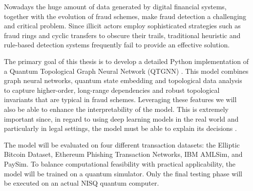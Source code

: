 \begin{center}
\Large{}
\end{center}
\bigskip

\begin{itshape}
Nowadays the huge amount of data generated by digital financial systems, together with the evolution of fraud schemes, make fraud detection a challenging and critical problem.
Since illicit actors employ sophisticated strategies such as fraud rings and cyclic transfers to obscure their trails, traditional heuristic and rule-based detection systems frequently fail to provide an effective solution.

The primary goal of this thesis is to develop a detailed Python implementation of a Quantum Topological Graph Neural Network (QTGNN) \cite{mainarticle}. This model combines graph neural networks, quantum state embedding and topological data analysis to capture higher-order, long-range dependencies and robust topological invariants that are typical in fraud schemes.
Leveraging these features we will also be able to enhance the interpretability of the model. This is extremely important since, in regard to using deep learning models in the real world and particularly in legal settings, the model must be able to explain its decisions \cite{goodman2017european}.

The model will be evaluated on four different transaction datasets: the Elliptic Bitcoin Dataset, Ethereum Phishing Transaction Networks, IBM AMLSim, and PaySim. To balance computational feasibility with practical applicability, the model will be trained on a quantum simulator. Only the final testing phase will be executed on an actual NISQ quantum computer.
\end{itshape}

